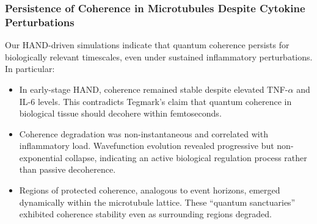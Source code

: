 \subsubsection{Persistence of Coherence in Microtubules Despite Cytokine Perturbations}
Our HAND-driven simulations indicate that quantum coherence persists for biologically relevant timescales, even under sustained inflammatory perturbations. In particular:
\begin{itemize}
    \item In early-stage HAND, coherence remained stable despite elevated TNF-$\alpha$ and IL-6 levels. This contradicts Tegmark’s claim that quantum coherence in biological tissue should decohere within femtoseconds.
    \item Coherence degradation was non-instantaneous and correlated with inflammatory load. Wavefunction evolution revealed progressive but non-exponential collapse, indicating an active biological regulation process rather than passive decoherence.
    \item Regions of protected coherence, analogous to event horizons, emerged dynamically within the microtubule lattice. These “quantum sanctuaries” exhibited coherence stability even as surrounding regions degraded.
\end{itemize}
